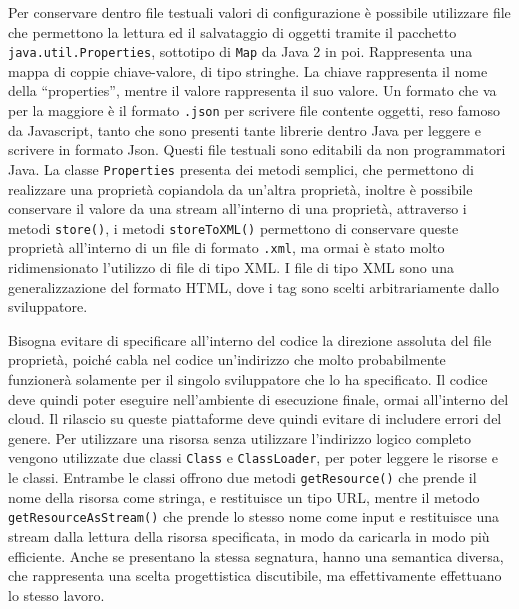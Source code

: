 \documentclass{article}
\numberwithin{equation}{subsection}
\begin{document}
Per conservare dentro file testuali valori di configurazione è possibile utilizzare file che permettono la lettura ed il salvataggio di oggetti tramite il pacchetto \verb|java.util.Properties|, 
sottotipo di \verb|Map| da Java 2 in poi. Rappresenta una mappa di coppie chiave-valore, di tipo stringhe. La chiave rappresenta il nome della ``properties'', mentre il valore 
rappresenta il suo valore. 
Un formato che va per la maggiore è il formato \verb|.json| per scrivere file contente oggetti, reso famoso da Javascript, tanto che sono presenti tante librerie dentro 
Java per leggere e scrivere in formato Json. 
Questi file testuali sono editabili da non programmatori Java. 
La classe \verb|Properties| presenta dei metodi semplici, che permettono di realizzare una proprietà copiandola da un'altra proprietà, inoltre è possibile conservare il valore 
da una stream all'interno di una proprietà, attraverso i metodi \verb|store()|, i metodi \verb|storeToXML()| permettono di conservare queste proprietà all'interno di un file 
di formato \verb|.xml|, ma ormai è stato molto ridimensionato l'utilizzo di file di tipo XML. 
I file di tipo XML sono una generalizzazione del formato HTML, dove i tag sono scelti arbitrariamente dallo sviluppatore. 

Bisogna evitare di specificare all'interno del codice la direzione assoluta del file proprietà, poiché cabla nel codice un'indirizzo che molto probabilmente funzionerà 
solamente per il singolo sviluppatore che lo ha specificato. Il codice deve quindi poter eseguire nell'ambiente di esecuzione finale, ormai all'interno del cloud. Il rilascio 
su queste piattaforme deve quindi evitare di includere errori del genere. 
Per utilizzare una risorsa senza utilizzare l'indirizzo logico completo vengono utilizzate due classi \verb|Class| e \verb|ClassLoader|, per poter leggere le risorse e le classi. 
Entrambe le classi offrono due metodi \verb|getResource()| che prende il nome della risorsa come stringa, e restituisce un tipo URL, mentre il metodo \verb|getResourceAsStream()| che 
prende lo stesso nome come input e restituisce una stream dalla lettura della risorsa specificata, in modo da caricarla in modo più efficiente. Anche se presentano la 
stessa segnatura, hanno una semantica diversa, che rappresenta una scelta progettistica discutibile, ma effettivamente effettuano lo stesso lavoro. 
\end{document}
